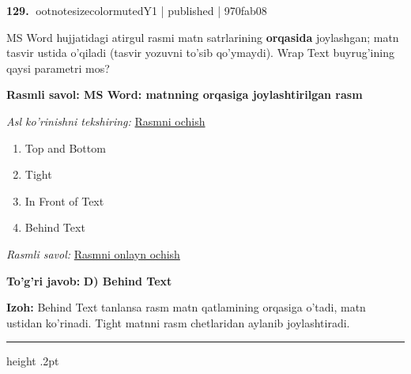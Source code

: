\documentclass[10pt,a4paper]{article}
\begin{document}
\textbf{\color{ink}129.} {ootnotesizecolor{muted}Y1 | published | 970fab08}
\par
MS Word hujjatidagi atirgul rasmi matn satrlarining \textbf{orqasida} joylashgan; matn tasvir ustida o'qiladi (tasvir yozuvni to'sib qo'ymaydi). Wrap Text buyrug'ining qaysi parametri mos?
\begin{center}\begin{tcolorbox}[colback=gray!4,colframe=teal!55!black,width=.94\linewidth,arc=1mm,boxrule=.4pt]
\textbf{Rasmli savol: MS Word: matnning orqasiga joylashtirilgan rasm}
\par\smallskip\textit{Asl ko'rinishni tekshiring: }\href{https://github.com/sarvar9417/attestatsiya/blob/main/public/kuzgi-demo/demo_q39_word.svg}{Rasmni ochish}
\end{tcolorbox}\end{center}
\begin{enumerate}[label=\Alph*),leftmargin=9mm]
\item Top and Bottom
\item Tight
\item In Front of Text
\item Behind Text
\end{enumerate}
\par\smallskip\textit{Rasmli savol: }\href{https://github.com/sarvar9417/attestatsiya/blob/main/public/kuzgi-demo/demo_q39_word.svg}{Rasmni onlayn ochish}
\begin{tcolorbox}[enhanced,breakable,colback=teal!4,colframe=teal!55!black,boxrule=0.45pt,arc=1.2mm,left=2.8mm,right=2.8mm,top=2mm,bottom=2mm]
\textbf{\color{teal}To'g'ri javob:} \textbf{D) Behind Text}
\par\smallskip
\textbf{Izoh:} Behind Text tanlansa rasm matn qatlamining orqasiga o'tadi, matn ustidan ko'rinadi. Tight matnni rasm chetlaridan aylanib joylashtiradi.
\end{tcolorbox}
\vspace{2mm}\hrule height .2pt\vspace{2mm}
\end{document}
